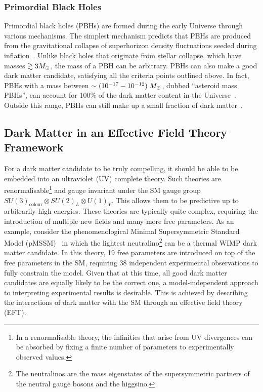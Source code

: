 \subsubsection*{Primordial Black Holes}

Primordial black holes (PBHs) are formed during the early Universe through various mechanisms. The simplest mechanism predicts that PBHs are produced from the gravitational collapse of superhorizon density fluctuations seeded during inflation~\cite{Hawking:1971ei_apr_Gravitationallycollapsedobjects, Carr:1974nx_Blackholesearly,Carr:1975qj_Primordialblackhole}. 
Unlike black holes that originate from stellar collapse, which have masses $\gtrsim 3M_\odot$, the mass of a PBH can be arbitrary.  PBHs can also make a good dark matter candidate, satisfying all the criteria points outlined above. In fact, PBHs with a mass between $\sim (10^{-17} - 10^{-12})\;M_\odot$, dubbed ``asteroid mass PBHs'', can account for 100\% of the dark matter content in the Universe~\cite{Montero-Camacho:2019jte_aug_Revisitingconstraintsasteroidmass}. Outside this range, PBHs can still make up a small fraction of dark matter~\cite{Villanueva-Domingo:2021spv_may_Briefreviewprimordial}. 

\subsection{Dark Matter in an Effective Field Theory Framework}
\label{subsec:DM_EFTs}

For a dark matter candidate to be truly compelling, it should be able to be embedded into an ultraviolet (UV) complete theory. Such theories are renormalisable\footnote{In a renormalisable theory, the infinities that arise from UV divergences can be absorbed by fixing a finite number of parameters to experimentally observed values.} and gauge invariant under the SM gauge group $SU(3)_\mathrm{colour}\otimes SU(2)_L\otimes U(1)_Y$. This allows them to be predictive up to arbitrarily high energies. These theories are typically quite complex, requiring the introduction of multiple new fields and many more free parameters. As an example, consider the phenomenological Minimal Supersymmetric Standard Model (pMSSM)~\cite{Villanueva-Domingo:2021spv_may_Briefreviewprimordial} in which the lightest neutralino\footnote{The neutralinos are the mass eigenstates of the supersymmetric partners of the neutral gauge bosons and the higgsino.} can be a thermal WIMP dark matter candidate. In this theory, 19 free parameters are introduced on top of the free parameters in the SM, requiring 38 independent experimental observations to fully constrain the model. Given that at this time, all good dark matter candidates are equally likely to be the correct one, a model-independent approach to interpreting experimental results is desirable. This is achieved by describing the interactions of dark matter with the SM through an effective field theory (EFT).

